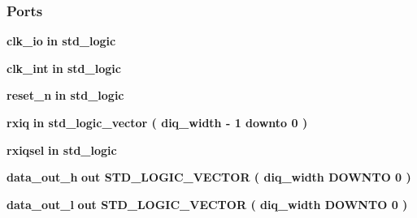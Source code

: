 \subsubsection*{Ports}
 \begin{DoxyCompactItemize}
\item 
{\bf clk\+\_\+io}  {\bfseries {\bfseries \textcolor{keywordflow}{in}\textcolor{vhdlchar}{ }}} {\bfseries \textcolor{comment}{std\+\_\+logic}\textcolor{vhdlchar}{ }} 
\item 
{\bf clk\+\_\+int}  {\bfseries {\bfseries \textcolor{keywordflow}{in}\textcolor{vhdlchar}{ }}} {\bfseries \textcolor{comment}{std\+\_\+logic}\textcolor{vhdlchar}{ }} 
\item 
{\bf reset\+\_\+n}  {\bfseries {\bfseries \textcolor{keywordflow}{in}\textcolor{vhdlchar}{ }}} {\bfseries \textcolor{comment}{std\+\_\+logic}\textcolor{vhdlchar}{ }} 
\item 
{\bf rxiq}  {\bfseries {\bfseries \textcolor{keywordflow}{in}\textcolor{vhdlchar}{ }}} {\bfseries \textcolor{comment}{std\+\_\+logic\+\_\+vector}\textcolor{vhdlchar}{ }\textcolor{vhdlchar}{(}\textcolor{vhdlchar}{ }\textcolor{vhdlchar}{ }\textcolor{vhdlchar}{ }\textcolor{vhdlchar}{ }{\bfseries {\bf diq\+\_\+width}} \textcolor{vhdlchar}{-\/}\textcolor{vhdlchar}{ } \textcolor{vhdldigit}{1} \textcolor{vhdlchar}{ }\textcolor{keywordflow}{downto}\textcolor{vhdlchar}{ }\textcolor{vhdlchar}{ } \textcolor{vhdldigit}{0} \textcolor{vhdlchar}{ }\textcolor{vhdlchar}{)}\textcolor{vhdlchar}{ }} 
\item 
{\bf rxiqsel}  {\bfseries {\bfseries \textcolor{keywordflow}{in}\textcolor{vhdlchar}{ }}} {\bfseries \textcolor{comment}{std\+\_\+logic}\textcolor{vhdlchar}{ }} 
\item 
{\bf data\+\_\+out\+\_\+h}  {\bfseries {\bfseries \textcolor{keywordflow}{out}\textcolor{vhdlchar}{ }}} {\bfseries \textcolor{comment}{S\+T\+D\+\_\+\+L\+O\+G\+I\+C\+\_\+\+V\+E\+C\+T\+OR}\textcolor{vhdlchar}{ }\textcolor{vhdlchar}{(}\textcolor{vhdlchar}{ }\textcolor{vhdlchar}{ }\textcolor{vhdlchar}{ }\textcolor{vhdlchar}{ }{\bfseries {\bf diq\+\_\+width}} \textcolor{vhdlchar}{ }\textcolor{keywordflow}{D\+O\+W\+N\+TO}\textcolor{vhdlchar}{ }\textcolor{vhdlchar}{ } \textcolor{vhdldigit}{0} \textcolor{vhdlchar}{ }\textcolor{vhdlchar}{)}\textcolor{vhdlchar}{ }} 
\item 
{\bf data\+\_\+out\+\_\+l}  {\bfseries {\bfseries \textcolor{keywordflow}{out}\textcolor{vhdlchar}{ }}} {\bfseries \textcolor{comment}{S\+T\+D\+\_\+\+L\+O\+G\+I\+C\+\_\+\+V\+E\+C\+T\+OR}\textcolor{vhdlchar}{ }\textcolor{vhdlchar}{(}\textcolor{vhdlchar}{ }\textcolor{vhdlchar}{ }\textcolor{vhdlchar}{ }\textcolor{vhdlchar}{ }{\bfseries {\bf diq\+\_\+width}} \textcolor{vhdlchar}{ }\textcolor{keywordflow}{D\+O\+W\+N\+TO}\textcolor{vhdlchar}{ }\textcolor{vhdlchar}{ } \textcolor{vhdldigit}{0} \textcolor{vhdlchar}{ }\textcolor{vhdlchar}{)}\textcolor{vhdlchar}{ }} 
\end{DoxyCompactItemize}


